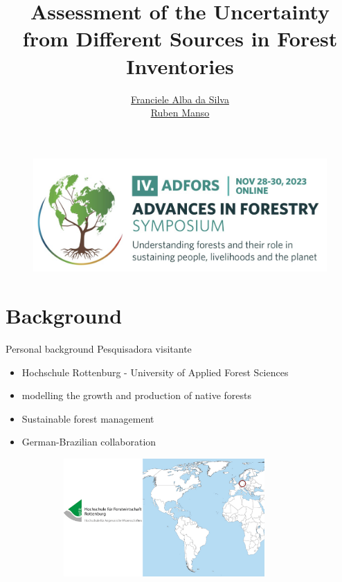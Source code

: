 \documentclass{beamer}
\author{\href{}{Franciele Alba da Silva\\ 
Ruben Manso}}
\institute{\href{}{University of Applied Forest Sciences Rottenburg\\ Forest Research-UK }}
\title{Assessment of the Uncertainty from Different Sources in Forest Inventories}
\subtitle{}
\date{}
\begin{document}
\kaishu
\begin{frame}
    \titlepage
    \begin{figure}[htpb]
        \begin{center}
            \includegraphics[width=0.5\linewidth]{polyu.png}
        \end{center}
    \end{figure}
\end{frame}

\begin{frame}
    \tableofcontents[sectionstyle=show,subsectionstyle=show/shaded/hide,subsubsectionstyle=show/shaded/hide]
\end{frame}

\section{Background}

\begin{frame}{Personal background}
Pesquisadora visitante
\begin{itemize}
    \item Hochschule Rottenburg - University of Applied Forest Sciences 
    \item modelling the growth and production of native forests
    \item Sustainable forest management 
    \item German-Brazilian collaboration
\end{itemize}
\begin{figure}
        \centering
        \includegraphics[width = 10cm, height = 4.5cm]{pic/germany.jpg}
       \end{figure}
\end{frame}
\end{document}
